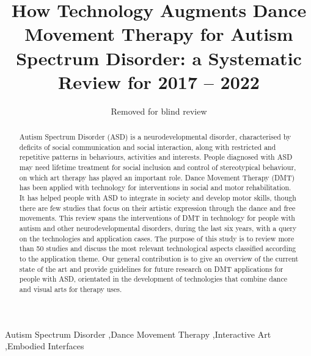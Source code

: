 \documentclass[a4paper,fleqn]{cas-sc}
\begin{document}
\let\WriteBookmarks\relax
\def\floatpagepagefraction{1}
\def\textpagefraction{.001}



\title[mode = title]{How Technology Augments Dance Movement Therapy for Autism Spectrum Disorder: a Systematic Review for 2017 -- 2022}


\author[]{Removed for blind review}            

\begin{abstract}
Autism Spectrum Disorder (ASD) is a neurodevelopmental disorder, characterised by deficits of social communication and social interaction, along with restricted and repetitive patterns in behaviours, activities and interests. People diagnosed with ASD may need lifetime treatment for social inclusion and control of stereotypical behaviour, on which art therapy has played an important role.
Dance Movement Therapy (DMT) has been applied with technology for interventions in social and motor rehabilitation. It has helped people with ASD to integrate in society and develop motor skills, though there are few studies that focus on their artistic expression through the dance and free movements.
This review spans the interventions of DMT in technology for people with autism and other neurodevelopmental disorders, during the last six years, with a query on the technologies and application cases. The purpose of this study is to review more than 50 studies and discuss the most relevant technological aspects classified according to the application theme.
Our general contribution is to give an overview of the current state of the art and provide guidelines for future research on DMT applications for people with ASD, orientated in the development of technologies that combine dance and visual arts for therapy uses.
\end{abstract}


\fntext[1]{}

\begin{keywords}
Autism Spectrum Disorder \sep Dance Movement Therapy \sep Interactive Art \sep Embodied Interfaces
\end{keywords}
\end{document}
